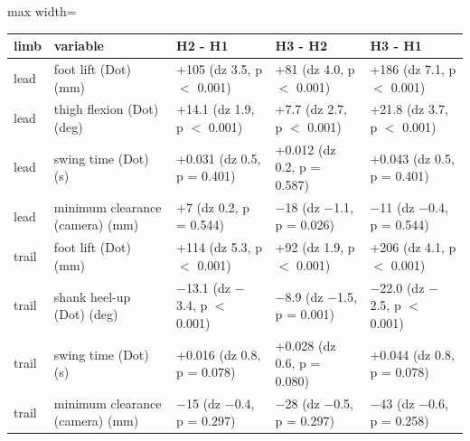 \begin{adjustbox}{max width=\textwidth}
{\scriptsize
\begin{tabular}{llp{3.4cm}p{3.4cm}p{3.4cm}}
\toprule
\textbf{limb} & \textbf{variable} & \textbf{H2 - H1} & \textbf{H3 - H2} & \textbf{H3 - H1} \\
\midrule
lead & foot lift (Dot) (mm) & +105 (dz 3.5, p $<$ 0.001) & +81 (dz 4.0, p $<$ 0.001) & +186 (dz 7.1, p $<$ 0.001) \\
lead & thigh flexion (Dot) (deg) & +14.1 (dz 1.9, p $<$ 0.001) & +7.7 (dz 2.7, p $<$ 0.001) & +21.8 (dz 3.7, p $<$ 0.001) \\
lead & swing time (Dot) (s) & +0.031 (dz 0.5, p = 0.401) & +0.012 (dz 0.2, p = 0.587) & +0.043 (dz 0.5, p = 0.401) \\
lead & minimum clearance (camera) (mm) & +7 (dz 0.2, p = 0.544) & $-$18 (dz $-$1.1, p = 0.026) & $-$11 (dz $-$0.4, p = 0.544) \\
trail & foot lift (Dot) (mm) & +114 (dz 5.3, p $<$ 0.001) & +92 (dz 1.9, p $<$ 0.001) & +206 (dz 4.1, p $<$ 0.001) \\
trail & shank heel-up (Dot) (deg) & $-$13.1 (dz $-$3.4, p $<$ 0.001) & $-$8.9 (dz $-$1.5, p = 0.001) & $-$22.0 (dz $-$2.5, p $<$ 0.001) \\
trail & swing time (Dot) (s) & +0.016 (dz 0.8, p = 0.078) & +0.028 (dz 0.6, p = 0.080) & +0.044 (dz 0.8, p = 0.078) \\
trail & minimum clearance (camera) (mm) & $-$15 (dz $-$0.4, p = 0.297) & $-$28 (dz $-$0.5, p = 0.297) & $-$43 (dz $-$0.6, p = 0.258) \\
\bottomrule
\end{tabular}
}
\end{adjustbox}
